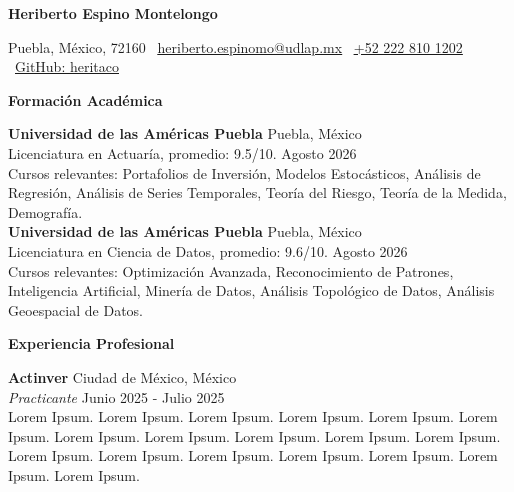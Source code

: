 \documentclass[8pt]{extarticle} %
\begin{document}
{\fontsize{10pt}{12pt}\selectfont  
\begin{center}  
    \textbf{Heriberto Espino Montelongo}\\  
    \vspace{1ex} %
\end{center}  
}

\begin{center}  
    Puebla, México, 72160 \textbullet \   
    \href{mailto:heriberto.espinomo@udlap.mx}{\textcolor{customblue}{\underline{heriberto.espinomo@udlap.mx}}} \textbullet \   
    \href{tel:+522228101202}{\textcolor{customblue}{\underline{+52 222 810 1202}}} \textbullet \   
    \href{https://github.com/heritaco}{\textcolor{customblue}{\underline{GitHub: heritaco}}}  
\end{center}

\begin{center}  
    \vspace{5ex}  
    \textbf{Formación Académica}  
    \vspace{-2ex}  
\end{center}

\textbf{Universidad de las Américas Puebla} \hfill Puebla, México\\  
Licenciatura en Actuaría, promedio: 9.5/10. \hfill Agosto 2026 \\  
Cursos relevantes: Portafolios de Inversión, Modelos Estocásticos, Análisis de Regresión, Análisis de Series Temporales, Teoría del Riesgo, Teoría de la Medida, Demografía.\\   

\textbf{Universidad de las Américas Puebla} \hfill Puebla, México\\  
Licenciatura en Ciencia de Datos, promedio: 9.6/10. \hfill Agosto 2026 \\  
Cursos relevantes: Optimización Avanzada, Reconocimiento de Patrones, Inteligencia Artificial, Minería de Datos, Análisis Topológico de Datos, Análisis Geoespacial de Datos.





\begin{center}  
    \vspace{2ex}  
    \textbf{Experiencia Profesional}  
    \vspace{-1ex}  
\end{center}

\textbf{Actinver} \hfill Ciudad de México, México\\  
\textit{Practicante} \hfill Junio 2025 - Julio 2025\\  
Lorem Ipsum. Lorem Ipsum. Lorem Ipsum. Lorem Ipsum. Lorem Ipsum. Lorem Ipsum. Lorem Ipsum. Lorem Ipsum. Lorem Ipsum. Lorem Ipsum. Lorem Ipsum. Lorem Ipsum. Lorem Ipsum. Lorem Ipsum. Lorem Ipsum. Lorem Ipsum. Lorem Ipsum. Lorem Ipsum.\\
\end{document}

